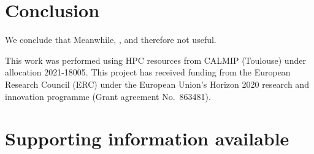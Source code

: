 \documentclass[aip,jcp,reprint,noshowkeys,superscriptaddress]{revtex4-1}
\begin{document}
\section{Conclusion}
\label{sec:ccl}

We conclude that 
Meanwhile, 
, and therefore not useful.


\begin{acknowledgements}
This work was performed using HPC resources from CALMIP (Toulouse) under allocation 2021-18005.
This project has received funding from the European Research Council (ERC) under the European Union's Horizon 2020 research and innovation programme (Grant agreement No.~863481).
\end{acknowledgements}

\section*{Supporting information available}
\label{sec:SI}



\end{document}
